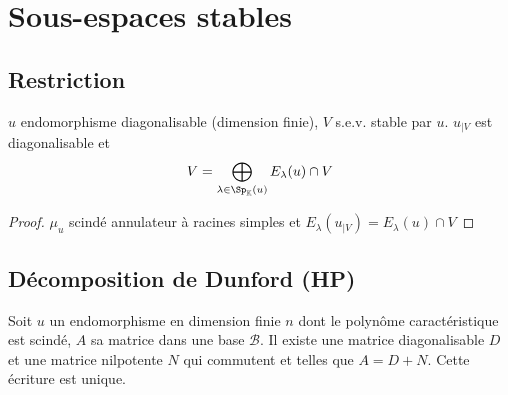 \section{Sous-espaces stables}

\subsection{Restriction}

\begin{prop}
    \Hyp $u$ endomorphisme diagonalisable (dimension finie), $V$ s.e.v. stable par $u$.
    \Conc $u_{|V}$ est diagonalisable et \[
        V=\bigoplus_{\lambda\in\Sp_{\mathbb K}(u)}E_\lambda(u)\cap V
    \]
\end{prop}

\begin{proof}
    $\mu_u$ scindé annulateur à racines simples et $E_\lambda(u_{|V})=E_\lambda(u)\cap V$
\end{proof}

\subsection{Décomposition de Dunford (HP)}


\begin{res}
    Soit $u$ un endomorphisme en dimension finie $n$ dont le polynôme caractéristique est scindé, $A$ sa matrice dans une base $\mathcal B$. Il existe une matrice diagonalisable $D$ et une matrice nilpotente $N$ qui commutent et telles que $A=D+N$. Cette écriture est unique.
\end{res}

